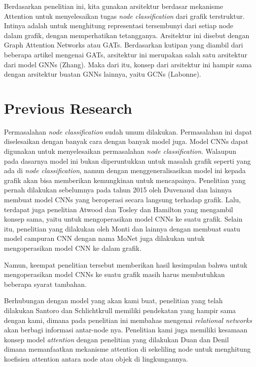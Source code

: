 \documentclass{article}
\begin{document}
Berdasarkan penelitian ini, kita gunakan arsitektur berdasar mekanisme Attention untuk menyelesaikan tugas \textit{node classification} dari grafik terstruktur. Intinya adalah untuk menghitung representasi tersembunyi dari setiap node dalam grafik, dengan memperhatikan tetangganya. Arsitektur ini disebut dengan Graph Attention Networks atau GATs. Berdasarkan kutipan yang diambil dari beberapa artikel mengenai GATs, arsitektur ini merupakan salah satu arsitektur dari model GNNs (Zhang\cite{article2}). Maka dari itu, konsep dari arsitektur ini hampir sama dengan arsitektur buatan GNNs lainnya, yaitu GCNs (Labonne\cite{article3}).

\section{Previous Research}
Permasalahan \textit{node classification} sudah umum dilakukan. Permasalahan ini dapat diselesaikan dengan banyak cara dengan banyak model juga. Model CNNs dapat digunakan untuk menyelesaikan permasalahan \textit{node classification}. Walaupun pada dasarnya model ini bukan diperuntukkan untuk masalah grafik seperti yang ada di \textit{node classification}, namun dengan menggeneralisasikan model ini kepada grafik akan bisa memberikan kemungkinan untuk mencapainya. Penelitian yang pernah dilakukan sebelumnya pada tahun 2015 oleh Duvenaud\cite{cite4} dan lainnya membuat model CNNs yang beroperasi secara langsung terhadap grafik. Lalu, terdapat juga penelitian Atwood dan Tosley\cite{cite5} dan Hamilton\cite{cite6} yang mengambil konsep sama, yaitu untuk mengoperasikan model CNNs ke suatu grafik. Selain itu, penelitian yang dilakukan oleh Monti\cite{cite7} dan lainnya dengan membuat suatu model campuran CNN dengan nama MoNet juga dilakukan untuk mengoperasikan model CNN ke dalam grafik. 

Namun, keempat penelitian tersebut memberikan hasil kesimpulan bahwa untuk mengoperasikan model CNNs ke suatu grafik masih harus membutuhkan beberapa syarat tambahan. 

Berhubungan dengan model yang akan kami buat, penelitian yang telah dilakukan Santoro\cite{cite8} dan Schlichtkrull\cite{cite9} memiliki pendekatan yang hampir sama dengan kami, dimana pada penelitian ini membahas mengenai \textit{relational networks} akan berbagi informasi antar-node nya. Penelitian kami juga memiliki kesamaan konsep model \textit{attention} dengan penelitian yang dilakukan Duan\cite{cite10} dan Denil\cite{cite11} dimana memanfaatkan mekanisme attention di sekeliling node untuk menghitung koefisien attention antara node atau objek di lingkungannya.
\end{document}
